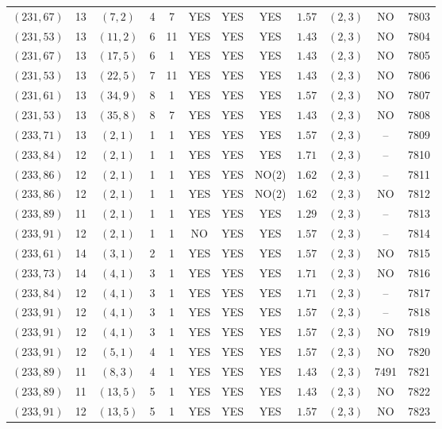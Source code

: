 \begin{longtable}{|c|c|c|c|c|c|c|c|c|c|c|c|}
$(231,67)$ & 13 & $(7,2)$ & 4 & 7 & YES & YES & YES & $1.57$ & $(2,3)$ & NO & 7803\\
$(231,53)$ & 13 & $(11,2)$ & 6 & 11 & YES & YES & YES & $1.43$ & $(2,3)$ & NO & 7804\\
$(231,67)$ & 13 & $(17,5)$ & 6 & 1 & YES & YES & YES & $1.43$ & $(2,3)$ & NO & 7805\\
$(231,53)$ & 13 & $(22,5)$ & 7 & 11 & YES & YES & YES & $1.43$ & $(2,3)$ & NO & 7806\\
$(231,61)$ & 13 & $(34,9)$ & 8 & 1 & YES & YES & YES & $1.57$ & $(2,3)$ & NO & 7807\\
$(231,53)$ & 13 & $(35,8)$ & 8 & 7 & YES & YES & YES & $1.43$ & $(2,3)$ & NO & 7808\\
$(233,71)$ & 13 & $(2,1)$ & 1 & 1 & YES & YES & YES & $1.57$ & $(2,3)$ & -- & 7809\\
$(233,84)$ & 12 & $(2,1)$ & 1 & 1 & YES & YES & YES & $1.71$ & $(2,3)$ & -- & 7810\\
$(233,86)$ & 12 & $(2,1)$ & 1 & 1 & YES & YES & NO(2) & $1.62$ & $(2,3)$ & -- & 7811\\
$(233,86)$ & 12 & $(2,1)$ & 1 & 1 & YES & YES & NO(2) & $1.62$ & $(2,3)$ & NO & 7812\\
$(233,89)$ & 11 & $(2,1)$ & 1 & 1 & YES & YES & YES & $1.29$ & $(2,3)$ & -- & 7813\\
$(233,91)$ & 12 & $(2,1)$ & 1 & 1 & NO & YES & YES & $1.57$ & $(2,3)$ & -- & 7814\\
$(233,61)$ & 14 & $(3,1)$ & 2 & 1 & YES & YES & YES & $1.57$ & $(2,3)$ & NO & 7815\\
$(233,73)$ & 14 & $(4,1)$ & 3 & 1 & YES & YES & YES & $1.71$ & $(2,3)$ & NO & 7816\\
$(233,84)$ & 12 & $(4,1)$ & 3 & 1 & YES & YES & YES & $1.71$ & $(2,3)$ & -- & 7817\\
$(233,91)$ & 12 & $(4,1)$ & 3 & 1 & YES & YES & YES & $1.57$ & $(2,3)$ & -- & 7818\\
$(233,91)$ & 12 & $(4,1)$ & 3 & 1 & YES & YES & YES & $1.57$ & $(2,3)$ & NO & 7819\\
$(233,91)$ & 12 & $(5,1)$ & 4 & 1 & YES & YES & YES & $1.57$ & $(2,3)$ & NO & 7820\\
$(233,89)$ & 11 & $(8,3)$ & 4 & 1 & YES & YES & YES & $1.43$ & $(2,3)$ & 7491 & 7821\\
$(233,89)$ & 11 & $(13,5)$ & 5 & 1 & YES & YES & YES & $1.43$ & $(2,3)$ & NO & 7822\\
$(233,91)$ & 12 & $(13,5)$ & 5 & 1 & YES & YES & YES & $1.57$ & $(2,3)$ & NO & 7823\\

\end{longtable}
